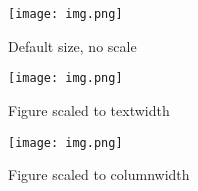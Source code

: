 \documentclass[letterpaper, 10pt, twocolumn]{article}
\begin{document}
\begin{figure*}[hp]
\centering
\texttt{[image: img.png]}
\caption{Default size, no scale}
\end{figure*}

\begin{figure*}[hp]
\centering
\texttt{[image: img.png]}
\caption{Figure scaled to textwidth}
\end{figure*}

\begin{figure}[hp]
\centering
\texttt{[image: img.png]}
\caption{Figure scaled to columnwidth}
\end{figure}
\end{document}

